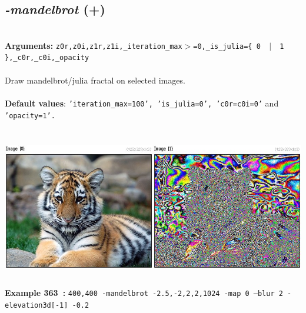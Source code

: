 \documentclass[a4paper,11pt,twoside]{book}
\begin{document}
\subsection{\emph{-mandelbrot} (+)}\vspace*{-0.5em}
~\\\textbf{Arguments: } 
{\small \texttt{z0r,z0i,z1r,z1i,\_iteration\_max$>$=0,\_is\_julia=\{ 0 ~$|$~ 1 \},\_c0r,\_c0i,\_opacity}}\\~\\
Draw mandelbrot/julia fractal on selected images.
~\\~\\\textbf{Default values}: {\small \texttt{'iteration\_max=100', 'is\_julia=0', 'c0r=c0i=0'} and \texttt{'opacity=1'.}}
\begin{center}\includegraphics[keepaspectratio=true,height=7cm,width=\textwidth]{img/gmic_def363.jpg}\\
{\footnotesize \textbf{Example 363~:} \texttt{400,400 -mandelbrot -2.5,-2,2,2,1024 -map 0 --blur 2 -elevation3d[-1] -0.2}}
\end{center}
\end{document}
